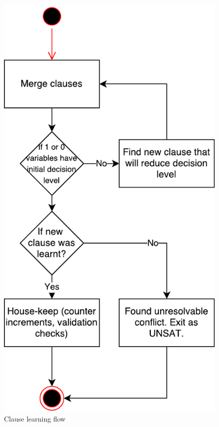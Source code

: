\documentclass[12pt,english,pdflatex]{aghdpl}
\begin{document}
\begin{figure}[H]
\begin{centering}
\includegraphics[scale=0.7]{img/learn_clause}
\par\end{centering}
\caption{Clause learning flow}
\end{figure}
\end{document}

